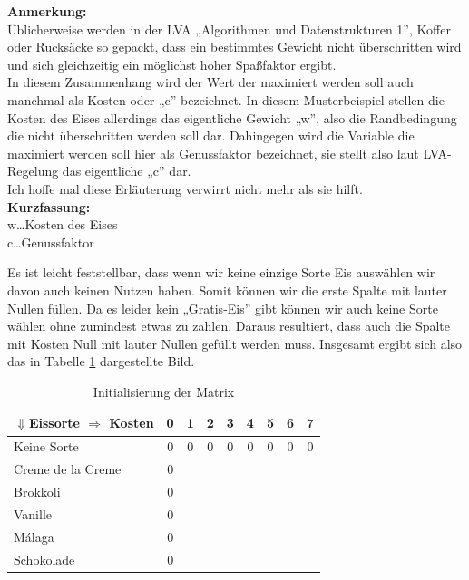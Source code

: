 \documentclass[a4paper, 12pt]{article}
\begin{document}
\begin{leftbar}
	\textbf{Anmerkung:}\\
	
	Üblicherweise werden in der LVA „Algorithmen und Datenstrukturen 1”, Koffer oder Rucksäcke so gepackt, dass ein bestimmtes Gewicht nicht überschritten wird und sich gleichzeitig ein möglichst hoher Spaßfaktor ergibt.\\

	In diesem Zusammenhang wird der Wert der maximiert werden soll auch manchmal als Kosten oder „c” bezeichnet. In diesem Musterbeispiel stellen die Kosten des Eises allerdings das eigentliche Gewicht „w”, also die Randbedingung die nicht überschritten werden soll dar. Dahingegen wird die Variable die maximiert werden soll hier als Genussfaktor bezeichnet, sie stellt also laut LVA-Regelung das eigentliche „c” dar.\\

	Ich hoffe mal diese Erläuterung verwirrt nicht mehr als sie hilft.\\
	
	\textbf{Kurzfassung:}\\
	w\dots Kosten des Eises\\
	c\dots Genussfaktor
\end{leftbar}

Es ist leicht feststellbar, dass wenn wir keine einzige Sorte Eis auswählen wir davon auch keinen Nutzen haben. Somit können wir die erste Spalte mit lauter Nullen füllen. Da es leider kein „Gratis-Eis” gibt können wir auch keine Sorte wählen ohne zumindest etwas zu zahlen. Daraus resultiert, dass auch die Spalte mit Kosten Null mit lauter Nullen gefüllt werden muss. Insgesamt ergibt sich also das in Tabelle \ref{table:Initialisierung} dargestellte Bild.

\begin{table}[H]
	\begin{center}
		\begin{tabular}{l|cccccccc}
			$\Downarrow$Eissorte $\Rightarrow$ Kosten & 0 & 1 & 2 & 3 & 4 & 5 &
			6 & 7\\
			\hline
			Keine Sorte			& 0 & 0 & 0 & 0 & 0 & 0 & 0 & 0 \\
			Creme de la Creme	& 0 &	&	&	&	&	&	&	\\
			Brokkoli			& 0 &	&	&	&	&	&	&	\\
			Vanille				& 0 &	&	&	&	&	&	&	\\
			Málaga				& 0 &	&	&	&	&	&	&	\\
			Schokolade			& 0 &	&	&	&	&	&	&	\\
		\end{tabular}
	\end{center}
\caption{Initialisierung der Matrix}
\label{table:Initialisierung}
\end{table}
\end{document}
